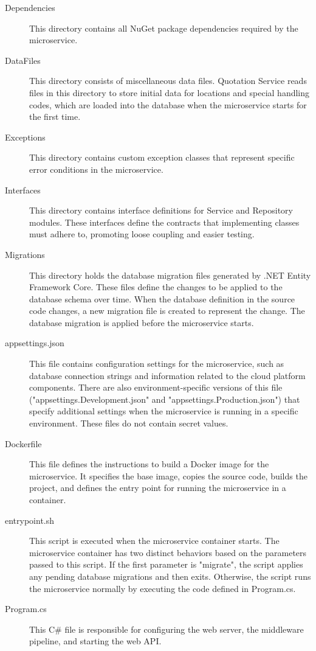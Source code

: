\documentclass[12pt, reqno]{amsbook}
\theoremstyle{definition}
\theoremstyle{definition}
\numberwithin{section}{chapter}
\numberwithin{table}{chapter}
\numberwithin{figure}{chapter}
\begin{document}
\begin{description}
  \item[Dependencies] This directory contains all NuGet package dependencies required by the microservice.
  \item[DataFiles] This directory consists of miscellaneous data files. Quotation Service reads files in this directory to store initial data for locations and special handling codes, which are loaded into the database when the microservice starts for the first time.
  \item[Exceptions] This directory contains custom exception classes that represent specific error conditions in the microservice.
  \item[Interfaces] This directory contains interface definitions for Service and Repository modules. These interfaces define the contracts that implementing classes must adhere to, promoting loose coupling and easier testing.
  \item[Migrations] This directory holds the database migration files generated by .NET Entity Framework Core. These files define the changes to be applied to the database schema over time. When the database definition in the source code changes, a new migration file is created to represent the change. The database migration is applied before the microservice starts.
  \item[appsettings.json] This file contains configuration settings for the microservice, such as database connection strings and information related to the cloud platform components. There are also environment-specific versions of this file ("appsettings.Development.json" and "appsettings.Production.json") that specify additional settings when the microservice is running in a specific environment. These files do not contain secret values.
  \item[Dockerfile] This file defines the instructions to build a Docker image for the microservice. It specifies the base image, copies the source code, builds the project, and defines the entry point for running the microservice in a container.
  \item[entrypoint.sh] This script is executed when the microservice container starts. The microservice container has two distinct behaviors based on the parameters passed to this script. If the first parameter is "migrate", the script applies any pending database migrations and then exits. Otherwise, the script runs the microservice normally by executing the code defined in Program.cs.
  \item[Program.cs] This C\# file is responsible for configuring the web server, the middleware pipeline, and starting the web \ac{API}.
\end{description}
\end{document}
